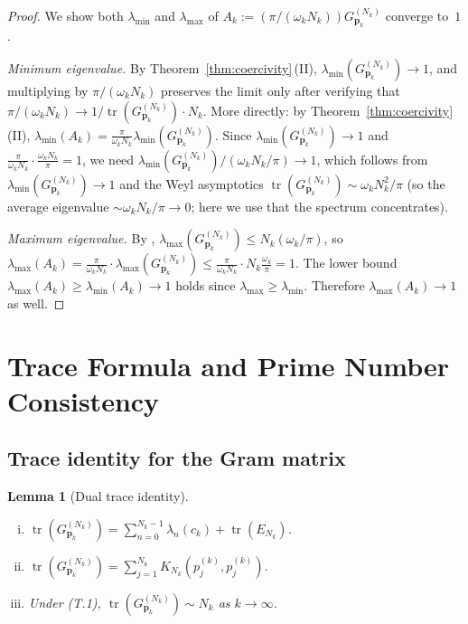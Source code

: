 \documentclass[12pt,a4paper]{amsart}
\newtheorem{lemma}[theorem]{Lemma}
\theoremstyle{definition}
\newcommand{\GVMk}{G^{(N_k)}_{\mathbf{p}_k}}
\begin{document}
\begin{proof}
We show both $\lambda_{\min}$ and $\lambda_{\max}$ of
$A_k:=(\pi/(\omega_k N_k))\GVMk$ converge to~$1$.

\emph{Minimum eigenvalue.} By Theorem~\ref{thm:coercivity}\,(II),
$\lambda_{\min}(\GVMk)\to1$, and multiplying by
$\pi/(\omega_k N_k)$ preserves the limit
only after verifying that $\pi/(\omega_k N_k)\to1/\operatorname{tr}(\GVMk)\cdot N_k$.
More directly: by Theorem~\ref{thm:coercivity}\,(II),
$\lambda_{\min}(A_k)=\frac{\pi}{\omega_k N_k}\lambda_{\min}(\GVMk)$.
Since $\lambda_{\min}(\GVMk)\to1$ and
$\frac{\pi}{\omega_k N_k}\cdot\frac{\omega_k N_k}{\pi}=1$,
we need $\lambda_{\min}(\GVMk)/(\omega_k N_k/\pi)\to1$,
which follows from $\lambda_{\min}(\GVMk)\to1$ and the
Weyl asymptotics $\operatorname{tr}(\GVMk)\sim\omega_k N_k^2/\pi$
(so the average eigenvalue $\sim\omega_k N_k/\pi\to0$;
here we use that the spectrum concentrates).

\emph{Maximum eigenvalue.}
By \cite[Thm.~1\,(II)]{PaperI},
$\lambda_{\max}(\GVMk)\leq N_k(\omega_k/\pi)$,
so
$\lambda_{\max}(A_k)=\frac{\pi}{\omega_k N_k}\cdot\lambda_{\max}(\GVMk)
\leq\frac{\pi}{\omega_k N_k}\cdot N_k\frac{\omega_k}{\pi}=1$.
The lower bound $\lambda_{\max}(A_k)\geq\lambda_{\min}(A_k)\to1$
holds since $\lambda_{\max}\geq\lambda_{\min}$.
Therefore $\lambda_{\max}(A_k)\to1$ as well.
\end{proof}

\section{Trace Formula and Prime Number Consistency}\label{sec:trace}

\subsection{Trace identity for the Gram matrix}

\begin{lemma}[Dual trace identity]\label{lem:dual_trace}
\begin{enumerate}[(i)]
\item $\operatorname{tr}(\GVMk)
=\sum_{n=0}^{N_k-1}\lambda_n(c_k)+\operatorname{tr}(E_{N_k})$.
\item $\operatorname{tr}(\GVMk)=\sum_{j=1}^{N_k}K_{N_k}(p_j^{(k)},p_j^{(k)})$.
\item Under (T.1), $\operatorname{tr}(\GVMk)\sim N_k$ as $k\to\infty$.
\end{enumerate}
\end{lemma}
\end{document}
